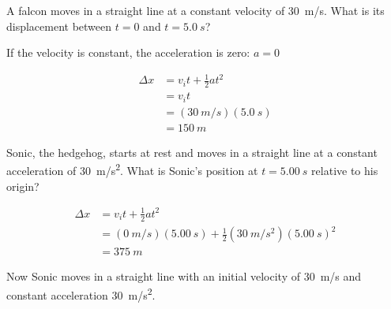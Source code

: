 \documentclass[../main-physics-problems.tex]{subfiles}
\begin{document}
\begin{questions}
\question %
A falcon moves in a straight line at a constant velocity of \SI{30}{m/s}. What is its displacement between $t = 0$ and $t = \SI{5.0}{s}$?

\begin{solution}
If the velocity is constant, the acceleration is zero: $a = 0$

\begin{align*}
    \Delta x &= v_i t + \frac{1}{2} a t^2 \\
    &= v_i t \\[1ex] 
    &= (\SI{30}{m/s})(\SI{5.0}{s}) \\[1ex]
    &= \boxed{\SI{150}{m}}
\end{align*}
\end{solution}

\question %
Sonic, the hedgehog, starts at rest and moves in a straight line at a constant acceleration of \SI{30}{m/s^2}. What is Sonic's position at $t = \SI{5.00}{s}$ relative to his origin?

\begin{solution}
    \begin{align*}
        \Delta x &= v_i t +\frac{1}{2}a t^2 \\[1ex]
        &= (\SI{0}{m/s})(\SI{5.00}{s}) + \frac{1}{2}(\SI{30}{m/s^2})(\SI{5.00}{s})^2 \\[1ex]
        &= \boxed{\SI{375}{m}}
    \end{align*}
\end{solution}

\question %
Now Sonic moves in a straight line with an initial velocity of \SI{30}{m/s} and constant acceleration \SI{30}{m/s^2}. 

\end{questions}
\end{document}
